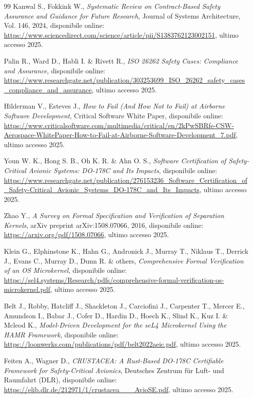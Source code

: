 \documentclass[italian, Lau, oneside]{sapthesis} %
\begin{document}
\begin{thebibliography}{99}
Kanwal S., Fokkink W., \textit{Systematic Review on Contract-Based Safety Assurance and Guidance for Future Research}, Journal of Systems Architecture, Vol. 146, 2024, disponibile online: \url{https://www.sciencedirect.com/science/article/pii/S1383762123002151}, ultimo accesso 2025.

Palin R., Ward D., Habli I. \& Rivett R., \textit{ISO 26262 Safety Cases: Compliance and Assurance}, disponibile online: \url{https://www.researchgate.net/publication/303253699_ISO_26262_safety_cases_compliance_and_assurance}, ultimo accesso 2025.

Hilderman V., Esteves J., \textit{How to Fail (And How Not to Fail) at Airborne Software Development}, Critical Software White Paper, disponibile online: \url{https://www.criticalsoftware.com/multimedia/critical/en/2kPwSBRfe-CSW-Aerospace-WhitePaper-How-to-Fail-at-Airborne-Software-Development_7.pdf}, ultimo accesso 2025.

Youn W. K., Hong S. B., Oh K. R. \& Ahn O. S., \textit{Software Certification of Safety-Critical Avionic Systems: DO-178C and Its Impacts}, disponibile online: \url{https://www.researchgate.net/publication/276153236_Software_Certification_of_Safety-Critical_Avionic_Systems_DO-178C_and_Its_Impacts}, ultimo accesso 2025.

Zhao Y., \textit{A Survey on Formal Specification and Verification of Separation Kernels}, arXiv preprint arXiv:1508.07066, 2016, disponibile online: \url{https://arxiv.org/pdf/1508.07066}, ultimo accesso 2025.

Klein G., Elphinstone K., Hahn G., Andronick J., Murray T., Niklaus T., Derrick J., Evans C., Murray D., Dunn R. \& others, \textit{Comprehensive Formal Verification of an OS Microkernel}, disponibile online: \url{https://sel4.systems/Research/pdfs/comprehensive-formal-verification-os-microkernel.pdf}, ultimo accesso 2025.

Belt J., Robby, Hatcliff J., Shackleton J., Carciofini J., Carpenter T., Mercer E., Amundson I., Babar J., Cofer D., Hardin D., Hoech K., Slind K., Kuz I. \& Mcleod K., \textit{Model-Driven Development for the seL4 Microkernel Using the HAMR Framework}, disponibile online: \url{https://loonwerks.com/publications/pdf/belt2022aeic.pdf}, ultimo accesso 2025.

Feiten A., Wagner D., \textit{CRUSTACEA: A Rust-Based DO-178C Certifiable Framework for Safety-Critical Avionics}, Deutsches Zentrum für Luft- und Raumfahrt (DLR), disponibile online: \url{https://elib.dlr.de/212971/1/crustacea___AvioSE.pdf}, ultimo accesso 2025.


\end{thebibliography}
\end{document}
